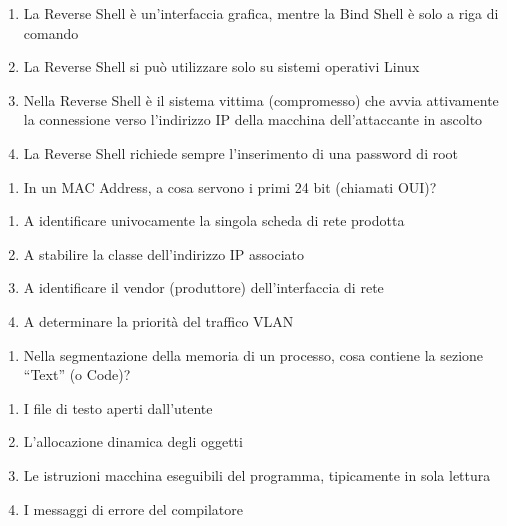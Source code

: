 \documentclass[11pt,a4paper]{article}
\providecommand{\tightlist}{%
  \setlength{\itemsep}{0pt}\setlength{\parskip}{0pt}}
\begin{document}
\begin{enumerate}
\def\labelenumi{\Alph{enumi})}
\tightlist
\item
  La Reverse Shell è un'interfaccia grafica, mentre la Bind Shell è solo
  a riga di comando
\item
  La Reverse Shell si può utilizzare solo su sistemi operativi Linux
\item
  Nella Reverse Shell è il sistema vittima (compromesso) che avvia
  attivamente la connessione verso l'indirizzo IP della macchina
  dell'attaccante in ascolto
\item
  La Reverse Shell richiede sempre l'inserimento di una password di root
\end{enumerate}

\begin{enumerate}
\def\labelenumi{\arabic{enumi}.}
\setcounter{enumi}{16}
\tightlist
\item
  In un MAC Address, a cosa servono i primi 24 bit (chiamati OUI)?
\end{enumerate}

\begin{enumerate}
\def\labelenumi{\Alph{enumi})}
\tightlist
\item
  A identificare univocamente la singola scheda di rete prodotta
\item
  A stabilire la classe dell'indirizzo IP associato
\item
  A identificare il vendor (produttore) dell'interfaccia di rete
\item
  A determinare la priorità del traffico VLAN
\end{enumerate}

\begin{enumerate}
\def\labelenumi{\arabic{enumi}.}
\setcounter{enumi}{17}
\tightlist
\item
  Nella segmentazione della memoria di un processo, cosa contiene la
  sezione ``Text'' (o Code)?
\end{enumerate}

\begin{enumerate}
\def\labelenumi{\Alph{enumi})}
\tightlist
\item
  I file di testo aperti dall'utente
\item
  L'allocazione dinamica degli oggetti
\item
  Le istruzioni macchina eseguibili del programma, tipicamente in sola
  lettura
\item
  I messaggi di errore del compilatore
\end{enumerate}
\end{document}
